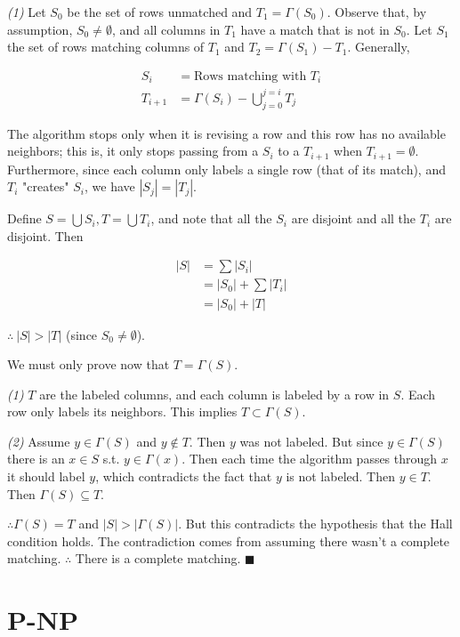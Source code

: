 \documentclass[a4paper]{article}
\begin{document}
\textit{(1)} Let $S_0$ be the set of rows unmatched and $T_1 = \Gamma(S_0)$.
Observe that, by assumption, $S_0 \neq \emptyset$, and all columns in $T_1$
have a match that is not in $S_0$. Let $S_1$ the set of rows matching columns
of $T_1$ and $T_2 = \Gamma(S_1) - T_1$. Generally, 

\begin{align*}
    S_i &= \text{Rows matching with } T_i \\ 
    T_{i+1} &= \Gamma(S_i) - \bigcup^{j=i}_{j=0} T_j
\end{align*}

The algorithm stops only when it is revising a row and this row has no
available neighbors; this is, it only stops passing from a $S_i$ to a $T_{i+1}$
when $T_{i+1} = \emptyset$. Furthermore, since each column only labels a single
row (that of its match), and $T_i$ "creates" $S_i$, we have $|S_j| = |T_j|$. 

Define $S = \bigcup S_i, T = \bigcup T_i$, and note that all the $S_i$ are
disjoint and all the $T_i$ are disjoint. Then

\begin{align*}
    |S| &= \sum |S_i| \\ 
        &= |S_0| + \sum |T_i| \\ 
        &= |S_0| + |T|
\end{align*}

$\therefore ~ |S| > |T|$ (since $S_0 \neq \emptyset$).

We must only prove now that $T = \Gamma(S)$. 

\textit{(1)} $T$ are the labeled columns, and each column is labeled by a row in $S$.
Each row only labels its neighbors. This implies $T \subset \Gamma(S)$.

\textit{(2)} Assume $y \in \Gamma(S)$ and $y \not\in T$. Then $y$ was 
not labeled. But since $y \in \Gamma(S)$ there is an 
$x \in S$ s.t. $y \in \Gamma(x)$. Then each time 
the algorithm passes through $x$ it should label 
$y$, which contradicts the fact that $y$ is not 
labeled. Then $y \in T$. Then $\Gamma(S) \subseteq T$.

$\therefore \Gamma(S) = T$ and $|S| > |\Gamma(S)|$. But this contradicts 
the hypothesis that the Hall condition holds. The 
contradiction comes from assuming there wasn't a 
complete matching. $\therefore $ There is a complete
matching. $\blacksquare$

\pagebreak
\section{P-NP}
\end{document}
